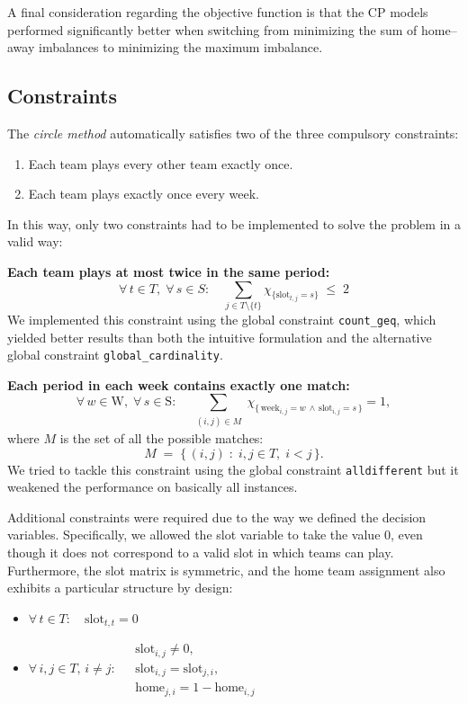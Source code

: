 \documentclass{article}
\begin{document}
A final consideration regarding the objective function is that the CP models performed significantly better when switching from minimizing the sum of home–away imbalances to minimizing the maximum imbalance.

\subsection{Constraints}
The \emph{circle method} automatically satisfies two of the three compulsory constraints:
\begin{enumerate}
    \item Each team plays every other team exactly once.
    \item Each team plays exactly once every week.
\end{enumerate}

In this way, only two constraints had to be implemented to solve the problem in a valid way:

\textbf{Each team plays at most twice in the same period:}
\[
\forall\, t \in T,\; \forall\, s \in S:\quad 
\sum_{j \in T \setminus \{t\}} \chi_{\{\text{slot}_{t,j} = s\}} \;\leq\; 2
\]
We implemented this constraint using the global constraint \texttt{count\_geq}, which yielded better results than both the intuitive formulation and the alternative global constraint \texttt{global\_cardinality}.

\textbf{Each period in each week contains exactly one match:}
\[
\forall\, w \in \text{W},\;
\forall\, s \in \text{S}:\quad
\sum_{\substack{(i,j) \in M}}
\chi_{\{\,\text{week}_{i,j} = w \,\wedge\, \text{slot}_{i,j} = s\,\}} = 1,
\]
where $M$ is the set of all the possible matches: \[
M \;=\; \bigl\{\,(i,j) \;:\; i,j \in T,\; i<j \,\bigr\}.
\]
We tried to tackle this constraint using the global constraint \texttt{alldifferent} but it weakened the performance on basically all instances.

Additional constraints were required due to the way we defined the decision variables. Specifically, we allowed the slot variable to take the value $0$, even though it does not correspond to a valid slot in which teams can play. Furthermore, the slot matrix is symmetric, and the home team assignment also exhibits a particular structure by design:
\begin{itemize}
    \item $\forall\, t \in T:\quad \text{slot}_{t,t} = 0$
    \item  $\forall\, i,j \in T,\, i \ne j:\;
\begin{aligned}
& \text{slot}_{i,j} \ne 0,\\
& \text{slot}_{i,j} = \text{slot}_{j,i},\\
& \text{home}_{j,i} = 1 - \text{home}_{i,j}
\end{aligned}$

\end{itemize}
\end{document}
